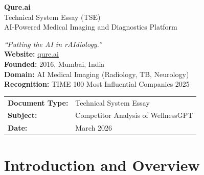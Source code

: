 \documentclass[12pt,a4paper]{article}
\begin{document}
\begin{titlepage}
    \centering\vspace*{2cm}
    {\Huge\bfseries\color{qureblue} Qure.ai}\\[0.5cm]
    {\Large\color{qurered} Technical System Essay (TSE)}\\[0.3cm]
    {\large\color{darkgray} AI-Powered Medical Imaging and Diagnostics Platform}\\[2cm]
    \begin{mdframed}[backgroundcolor=lightgray,linecolor=qureblue,linewidth=1.5pt,roundcorner=5pt]
        \centering\vspace{0.3cm}
        \textit{``Putting the AI in rAIdiology.''}\\[0.3cm]
        \textbf{Website:} \href{https://qure.ai}{qure.ai}\\
        \textbf{Founded:} 2016, Mumbai, India\\
        \textbf{Domain:} AI Medical Imaging (Radiology, TB, Neurology)\\
        \textbf{Recognition:} TIME 100 Most Influential Companies 2025\\
        \vspace{0.3cm}
    \end{mdframed}
    \vspace{2cm}
    \begin{tabular}{ll}
        \textbf{Document Type:} & Technical System Essay \\
        \textbf{Subject:} & Competitor Analysis of WellnessGPT \\
        \textbf{Date:} & March 2026 \\
    \end{tabular}
\end{titlepage}

\tableofcontents\newpage

\begin{abstract}
\noindent This TSE provides a detailed analysis of \textbf{Qure.ai}, a global leader in medical imaging AI based in Mumbai, India. Founded in 2016, Qure.ai deploys deep learning models for automated analysis of chest X-rays, head CT scans, lung nodule CT, and other imaging modalities. While WellnessGPT focuses on clinical workflow orchestration and patient management, Qure.ai focuses specifically on diagnostic imaging AI --- making it a complementary competitor in the broader healthcare AI landscape.
\end{abstract}\newpage

\section{Introduction and Overview}
\end{document}
